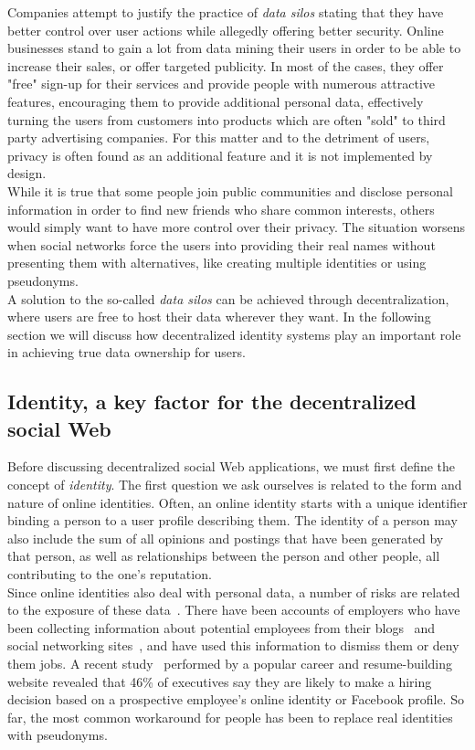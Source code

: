 Companies attempt to justify the practice of \textit{data silos} stating that they have better control over user actions while allegedly offering better security. Online businesses stand to gain a lot from data mining their users in order to be able to increase their sales, or offer targeted publicity. In most of the cases, they offer "free" sign-up for their services and provide people with numerous attractive features, encouraging them to provide additional personal data, effectively turning the users from customers into products which are often "sold" to third party advertising companies. For this matter and to the detriment of users, privacy is often found as an additional feature and it is not implemented by design.\\

While it is true that some people join public communities and disclose personal information in order to find new friends who share common interests, others would simply want to have more control over their privacy. The situation worsens when social networks force the users into providing their real names without presenting them with alternatives, like creating multiple identities or using pseudonyms.\\

A solution to the so-called \textit{data silos} can be achieved through decentralization, where users are free to host their data wherever they want. In the following section we will discuss how decentralized identity systems play an important role in achieving true data ownership for users.


\subsection{Identity, a key factor for the decentralized social Web}
\label{subsec:intro-id}
Before discussing decentralized social Web applications, we must first define the concept of \textit{identity}. The first question we ask ourselves is related to the form and nature of online identities. Often, an online identity starts with a unique identifier binding a person to a user profile describing them. The identity of a person may also include the sum of all opinions and postings that have been generated by that person, as well as relationships between the person and other people, all contributing to the one's reputation.\\

Since online identities also deal with personal data, a number of risks are related to the exposure of these data~\cite{rosenblum2007}. There have been accounts of employers who have been collecting information about potential employees from their blogs~\cite{viegas2005bloggers} and social networking sites~\cite{mannan2008privacy}, and have used this information to dismiss them or deny them jobs. A recent study~\cite{careerbuilder2009} performed by a popular career and resume-building website revealed that 46\% of executives say they are likely to make a hiring decision based on a prospective employee's online identity or Facebook profile. So far, the most common workaround for people has been to replace real identities with pseudonyms.\\

